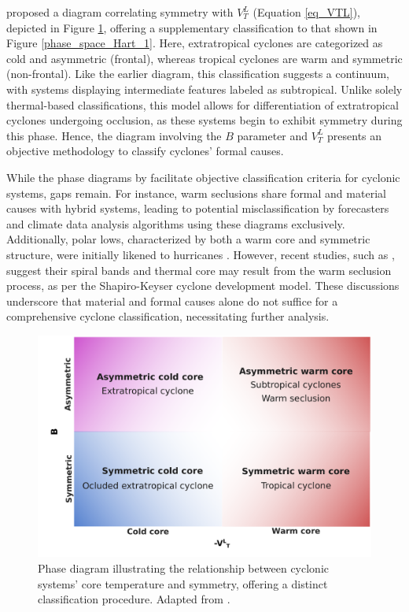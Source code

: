 \citet{hart2003cyclone} proposed a diagram correlating symmetry with \(V^{L}_{T}\) (Equation \ref{eq_VTL}), depicted in Figure \ref{phase_space_Hart_2}, offering a supplementary classification to that shown in Figure \ref{phase_space_Hart_1}. Here, extratropical cyclones are categorized as cold and asymmetric (frontal), whereas tropical cyclones are warm and symmetric (non-frontal). Like the earlier diagram, this classification suggests a continuum, with systems displaying intermediate features labeled as subtropical. Unlike solely thermal-based classifications, this model allows for differentiation of extratropical cyclones undergoing occlusion, as these systems begin to exhibit symmetry during this phase. Hence, the diagram involving the \(B\) parameter and \(V^{L}_{T}\) presents an objective methodology to classify cyclones' formal causes.

While the phase diagrams by \citet{hart2003cyclone} facilitate objective classification criteria for cyclonic systems, gaps remain. For instance, warm seclusions share formal and material causes with hybrid systems, leading to potential misclassification by forecasters and climate data analysis algorithms using these diagrams exclusively. Additionally, polar lows, characterized by both a warm core and symmetric structure, were initially likened to hurricanes \citep{rasmussen1989comparative,emanuel1989polar,nordeng1992most,rasmussen1985case,rasmussen1979polar}. However, recent studies, such as \citet{stoll2021polar}, suggest their spiral bands and thermal core may result from the warm seclusion process, as per the Shapiro-Keyser cyclone development model. These discussions underscore that material and formal causes alone do not suffice for a comprehensive cyclone classification, necessitating further analysis.

\begin{figure}[h]
\begin{center}
\setcaptionmargin{1cm}
\includegraphics[width=0.7\columnwidth,angle=0]{fig/hart_diagram_2.pdf}
\caption[Phase Diagram - Hart]{Phase diagram illustrating the relationship between cyclonic systems' core temperature and symmetry, offering a distinct classification procedure. Adapted from \citet{hart2003cyclone}.}
\label{phase_space_Hart_2}
\end{center}
\end{figure}


